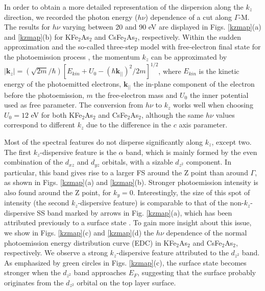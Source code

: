 \documentclass[twocolumn,aps,showpacs,preprintnumbers,amsmath,amssymb, superscriptaddress,longbibliography]{revtex4-1}
\renewcommand{\vec}{\mathbf}
\begin{document}

In order to obtain a more detailed representation of the dispersion along the $k_z$ direction, we recorded the photon energy ($h\nu$) dependence of a cut along $\Gamma$-M. The results for $h\nu$ varying between 20 and 90 eV are displayed in Figs. \ref{kzmap}(a) and \ref{kzmap}(b) for KFe$_2$As$_2$ and CsFe$_2$As$_2$, respectively. Within the sudden approximation and the so-called three-step model with free-electron final state for the photoemission process \cite{RichardJPCM27review}, the momentum $k_z$ can be approximated by $|\vec{k}_z|=(\sqrt{2m}/\hbar)[E_{kin}+U_0-(\hbar\vec{k_{||}})^2/{2m}]^{1/2}$, where $E_{kin}$ is the kinetic energy of the photoemitted electrons, $\vec{k_{||}}$ the in-plane component of the electron before the photoemission, $m$ the free-electron mass and $U_0$ the inner potential used as free parameter. The conversion from $h\nu$ to $k_z$ works well when choosing $U_0=12$ eV for both KFe$_2$As$_2$ and CsFe$_2$As$_2$, although the same $h\nu$ values correspond to different $k_z$ due to the difference in the $c$ axis parameter. 

Most of the spectral features do not disperse significantly along $k_z$, except two. The first $k_z$-dispersive feature is the $\alpha$ band, which is mainly formed by the even combination of the $d_{xz}$ and $d_{yz}$ orbitals, with a sizable $d_{z^2}$ component. In particular, this band gives rise to a larger FS around the Z point than around $\Gamma$, as shown in Figs. \ref{kzmap}(a) and \ref{kzmap}(b). Stronger photoemission intensity is also found around the Z point, for $k_y =0$. Interestingly, the size of this spot of intensity (the second $k_z$-dispersive feature) is comparable to that of the non-$k_z$-dispersive SS band marked by arrows in Fig. \ref{kzmap}(a), which has been attributed previously to a surface state \cite{Yoshida_JCPS72}. To gain more insight about this issue, we show in Figs. \ref{kzmap}(c) and \ref{kzmap}(d) the $h\nu$ dependence of the normal photoemission energy distribution curve (EDC) in KFe$_2$As$_2$ and CsFe$_2$As$_2$, respectively. We observe a strong $k_z$-dispersive feature attributed to the $d_{z^2}$ band. As emphasized by green circles in Figs. \ref{kzmap}(c), the surface state becomes stronger when the $d_{z^2}$ band approaches $E_F$, suggesting that the surface probably originates from the $d_{z^2}$ orbital on the top layer surface.
\end{document}
